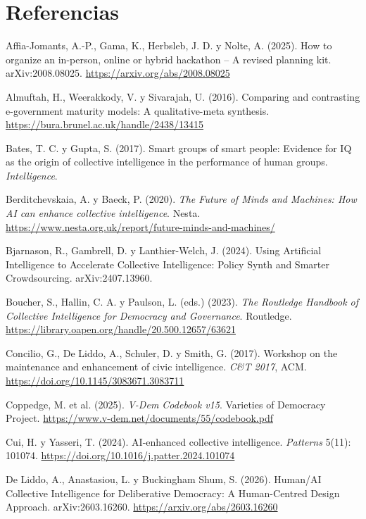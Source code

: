 \documentclass[11pt,a4paper]{article}
\begin{document}
\section*{Referencias}
\begingroup
\small
\setlength{\parindent}{-1.5em}
\setlength{\leftskip}{1.5em}
\setlength{\parskip}{0.3em}

Affia-Jomants, A.-P., Gama, K., Herbsleb, J. D. y Nolte, A. (2025). How to organize an in-person, online or hybrid hackathon -- A revised planning kit. arXiv:2008.08025. \url{https://arxiv.org/abs/2008.08025}

Almuftah, H., Weerakkody, V. y Sivarajah, U. (2016). Comparing and contrasting e-government maturity models: A qualitative-meta synthesis. \url{https://bura.brunel.ac.uk/handle/2438/13415}

Bates, T. C. y Gupta, S. (2017). Smart groups of smart people: Evidence for IQ as the origin of collective intelligence in the performance of human groups. \emph{Intelligence}.

Berditchevskaia, A. y Baeck, P. (2020). \emph{The Future of Minds and Machines: How AI can enhance collective intelligence}. Nesta. \url{https://www.nesta.org.uk/report/future-minds-and-machines/}

Bjarnason, R., Gambrell, D. y Lanthier-Welch, J. (2024). Using Artificial Intelligence to Accelerate Collective Intelligence: Policy Synth and Smarter Crowdsourcing. arXiv:2407.13960.

Boucher, S., Hallin, C. A. y Paulson, L. (eds.) (2023). \emph{The Routledge Handbook of Collective Intelligence for Democracy and Governance}. Routledge. \url{https://library.oapen.org/handle/20.500.12657/63621}

Concilio, G., De Liddo, A., Schuler, D. y Smith, G. (2017). Workshop on the maintenance and enhancement of civic intelligence. \emph{C\&T 2017}, ACM. \url{https://doi.org/10.1145/3083671.3083711}

Coppedge, M. et al. (2025). \emph{V-Dem Codebook v15}. Varieties of Democracy Project. \url{https://www.v-dem.net/documents/55/codebook.pdf}

Cui, H. y Yasseri, T. (2024). AI-enhanced collective intelligence. \emph{Patterns} 5(11): 101074. \url{https://doi.org/10.1016/j.patter.2024.101074}

De Liddo, A., Anastasiou, L. y Buckingham Shum, S. (2026). Human/AI Collective Intelligence for Deliberative Democracy: A Human-Centred Design Approach. arXiv:2603.16260. \url{https://arxiv.org/abs/2603.16260}
\end{document}
